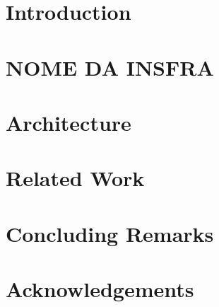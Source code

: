 \documentclass[12pt]{article}
\title{\papertitle}
\author{Rafael S. Durelli\inst{1,3}, M\'{a}rcio E. Delamaro\inst{1} and Valter V. de Camargo\inst{2}}
\begin{document}
 

\maketitle

\begin{abstract}

\end{abstract}
\section{Introduction\label{sec:introduction}}
 

% 

\section{NOME DA INSFRA\label{sec:proline}} 


%	


\section{Architecture\label{sec:architecture}}
 

\section{Related Work\label{sec:related}}
 

\section{Concluding Remarks\label{sec:conclusion}}
 

\section{Acknowledgements}
 



\end{document}
